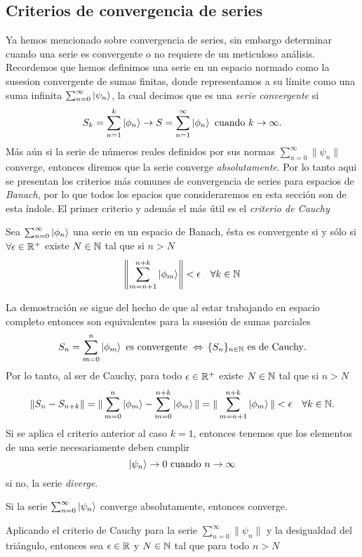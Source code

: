 \documentclass[main.tex]{subfiles}
\begin{document}
\subsection{Criterios de convergencia de series}
\noindent Ya hemos mencionado sobre convergencia de series, sin embargo determinar cuando una serie es convergente o no requiere de un meticuloso análisis. Recordemos que hemos definimos una serie en un espacio normado como la susesion convergente de sumas finitas, donde representamos a su límite como una suma infinita \(\sum_{n=0}^{\infty}\ket{\psi_n}\), la cual decimos que es una \emph{serie convergente} si
\[
    S_k=\sum_{n=1}^k\ket{\phi_n}\rightarrow S=\sum_{n=1}^{\infty}\ket{\phi_n}\text{ cuando }k\rightarrow\infty.
\]
\noindent Más aún si la serie de números reales definidos por sus normas  \(\sum_{n=0}^{\infty}\|\psi_n\|\) converge, entonces diremos que la serie converge \emph{absolutamente}.
Por lo tanto aqui se presentan los criterios más comunes de convergencia de series para espacios de \emph{Banach}, por lo que todos los epacios que consideraremos en esta sección son de esta índole. El primer criterio y además el más útil es el \emph{criterio de Cauchy}
\begin{prop}
  Sea \(\sum_{n=0}^{\infty}\ket{\phi_n}\) una serie en un espacio de Banach, ésta es convergente si y sólo si \(\forall\epsilon\in\mathbb R ^{+}\) existe \(N\in \mathbb N \) tal que si \(n>N\)
  \[
    \left\|\sum_{m=n+1}^{n+k}\ket{\phi_m}\right\|<\epsilon\quad\forall k\in \mathbb N 
  \]
\end{prop}
\dem La demostración se sigue del hecho de que al estar trabajando en espacio completo entonces son equivalentes para la susesión de sumas parciales
\[
    S_n=\sum_{m=0}^{n}\ket{\phi_m}\text{ es convergente }\Leftrightarrow\,\{S_n\}_{n\in \mathbb N }\text{ es de Cauchy}.
\]
\noindent Por lo tanto, al ser de Cauchy, para todo \(\epsilon\in\mathbb R ^{+}\) existe \(N\in \mathbb N \) tal que si \(n>N\)
\[
   \|S_n-S_{n+k}\|=\|\sum_{m=0}^{n}\ket{\phi_m}-\sum_{m=0}^{n+k}\ket{\phi_m}\|=\|\sum_{m=n+1}^{n+k}\ket{\phi_m}\|<\epsilon\quad\forall k\in \mathbb N .
\]
\obs Si se aplica el criterio anterior al caso \(k=1\), entonces tenemos que los elementos de una serie necesariamente deben cumplir
\[
    \ket{\psi_n}\rightarrow 0\text{ cuando } n\to\infty
\]
si no, la serie \emph{diverge}.
\QED
\begin{prop}
  Si la serie \(\sum_{n=0}^{\infty}\ket{\psi_n}\) converge absolutamente, entonces converge.
  \end{prop}
\dem Aplicando el criterio de Cauchy para la serie \(\sum_{n=0}^{\infty}\|\psi_n\|\) y la desigualdad del triángulo, entonces sea \(\epsilon\in\mathbb R \) y \(N\in \mathbb N \) tal que para todo \(n>N\)
\end{document}
